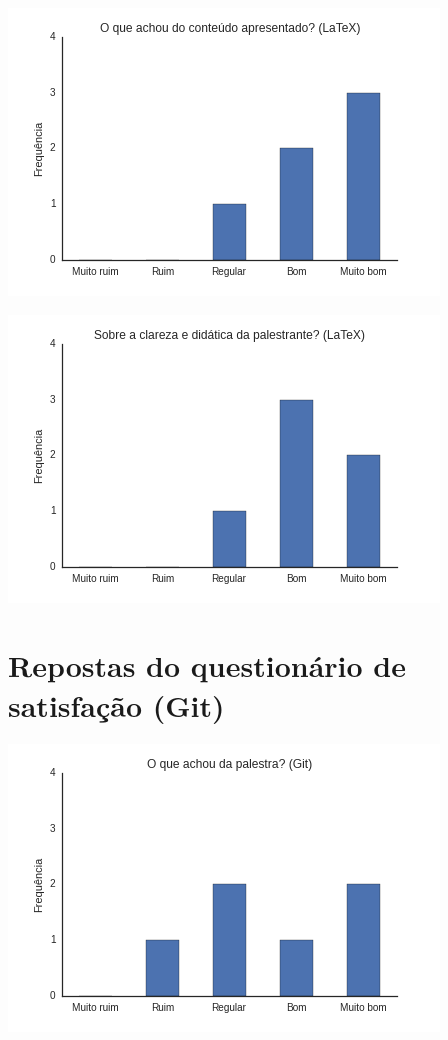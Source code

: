\documentclass[12pt]{article}
\begin{document}
\begin{center}
    \includegraphics[height=0.25\textheight]{images/latex2.png}
\end{center}

\begin{center}
    \includegraphics[height=0.25\textheight]{images/latex3.png}
\end{center}

\section*{Repostas do questionário de satisfação (Git)}

\begin{center}
    \includegraphics[height=0.25\textheight]{images/git1.png}
\end{center}
\end{document}
